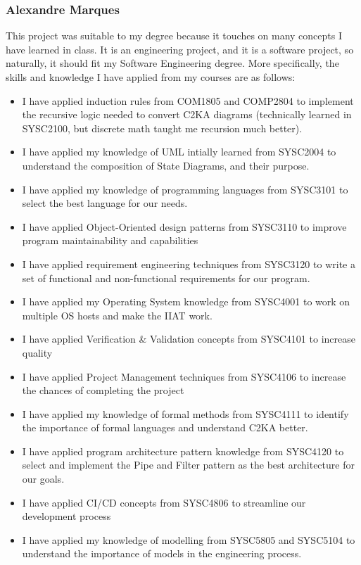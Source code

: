 \subsubsection{Alexandre Marques}
This project was suitable to my degree because it touches on many concepts I have learned in class.
It is an engineering project, and it is a software project, so naturally, it should fit my Software Engineering degree.
More specifically, the skills and knowledge I have applied from my courses are as follows:
\begin{itemize}
    \item I have applied induction rules from COM1805 and COMP2804 to implement the recursive logic needed to convert C2KA diagrams (technically learned in SYSC2100, but discrete math taught me recursion much better).
    \item I have applied my knowledge of UML intially learned from SYSC2004 to understand the composition of State Diagrams, and their purpose.
    \item I have applied my knowledge of programming languages from SYSC3101 to select the best language for our needs.
    \item I have applied Object-Oriented design patterns from SYSC3110 to improve program maintainability and capabilities
    \item I have applied requirement engineering techniques from SYSC3120 to write a set of functional and non-functional requirements for our program.
    \item I have applied my Operating System knowledge from SYSC4001 to work on multiple OS hosts and make the IIAT work.
    \item I have applied Verification \& Validation concepts from SYSC4101 to increase quality
    \item I have applied Project Management techniques from SYSC4106 to increase the chances of completing the project
    \item I have applied my knowledge of formal methods from SYSC4111 to identify the importance of formal languages and understand C2KA better.
    \item I have applied program architecture pattern knowledge from SYSC4120 to select and implement the Pipe and Filter pattern as the best architecture for our goals.
    \item I have applied CI/CD concepts from SYSC4806 to streamline our development process
    \item I have applied my knowledge of modelling from SYSC5805 and SYSC5104 to understand the importance of models in the engineering process.

\end{itemize}
